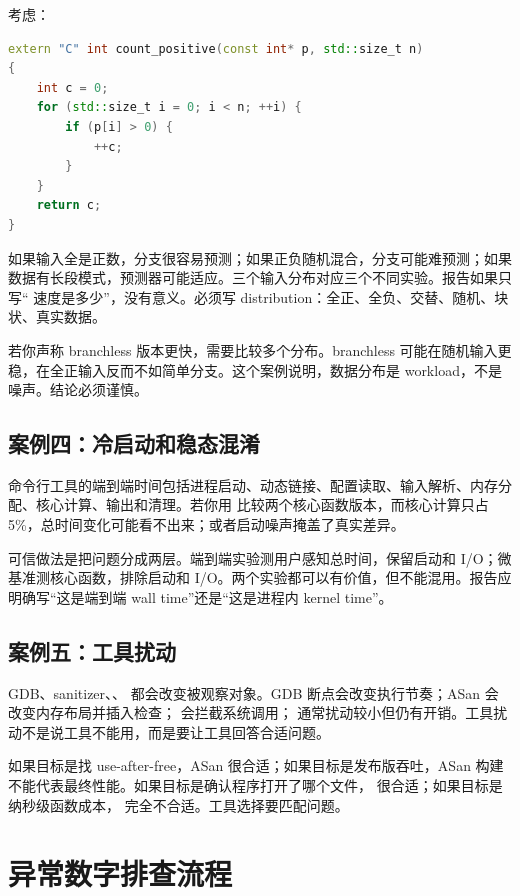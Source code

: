 考虑：

\begin{lstlisting}[language=C++]
extern "C" int count_positive(const int* p, std::size_t n)
{
    int c = 0;
    for (std::size_t i = 0; i < n; ++i) {
        if (p[i] > 0) {
            ++c;
        }
    }
    return c;
}
\end{lstlisting}

如果输入全是正数，分支很容易预测；如果正负随机混合，分支可能难预测；如果数据有长段模式，预测器可能适应。三个输入分布对应三个不同实验。报告如果只写“ 速度是多少”，没有意义。必须写 distribution：全正、全负、交替、随机、块状、真实数据。

若你声称 branchless 版本更快，需要比较多个分布。branchless 可能在随机输入更稳，在全正输入反而不如简单分支。这个案例说明，数据分布是 workload，不是噪声。结论必须谨慎。

\subsection{案例四：冷启动和稳态混淆}

命令行工具的端到端时间包括进程启动、动态链接、配置读取、输入解析、内存分配、核心计算、输出和清理。若你用  比较两个核心函数版本，而核心计算只占 5\%，总时间变化可能看不出来；或者启动噪声掩盖了真实差异。

可信做法是把问题分成两层。端到端实验测用户感知总时间，保留启动和 I/O；微基准测核心函数，排除启动和 I/O。两个实验都可以有价值，但不能混用。报告应明确写“这是端到端 wall time”还是“这是进程内 kernel time”。

\subsection{案例五：工具扰动}

GDB、sanitizer、、 都会改变被观察对象。GDB 断点会改变执行节奏；ASan 会改变内存布局并插入检查； 会拦截系统调用； 通常扰动较小但仍有开销。工具扰动不是说工具不能用，而是要让工具回答合适问题。

如果目标是找 use-after-free，ASan 很合适；如果目标是发布版吞吐，ASan 构建不能代表最终性能。如果目标是确认程序打开了哪个文件， 很合适；如果目标是纳秒级函数成本， 完全不合适。工具选择要匹配问题。

\section{异常数字排查流程}

